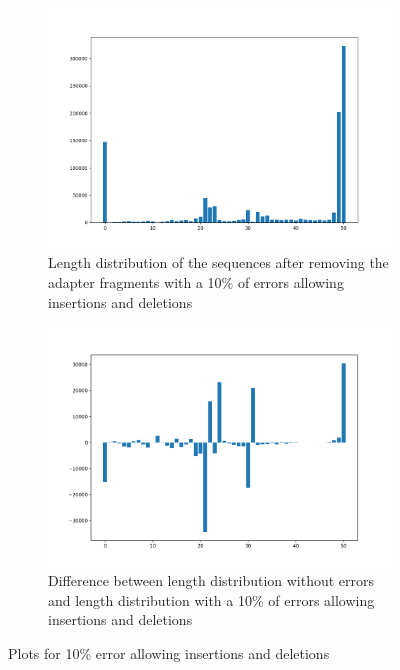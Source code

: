 \documentclass[a4paper,10pt]{article}
\begin{document}
\begin{figure}
    \centering
    \begin{subfigure}[b]{1\textwidth}
       \includegraphics[width=12cm]{images/length-distr-10-id.png}
       \caption{Length distribution of the sequences after removing the adapter fragments with a 10\% of errors allowing insertions and deletions}
       \label{fig:10id} 
    \end{subfigure}
    
    \begin{subfigure}[b]{1\textwidth}
       \includegraphics[width=12cm]{images/length-distr-length-distr-10-id.png}
       \caption{Difference between length distribution without errors and length distribution with a 10\% of errors allowing insertions and deletions}
       \label{fig:diff10id}
    \end{subfigure}
    
    \caption{Plots for 10\% error allowing insertions and deletions}
\end{figure}
\end{document}
